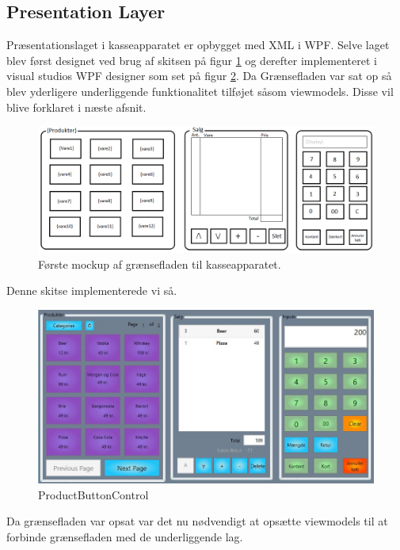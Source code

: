 
\subsection{Presentation Layer}
Præsentationslaget i kasseapparatet er opbygget med XML i WPF. Selve laget blev først designet ved brug af skitsen på figur \ref{fig:KasseMockup} og derefter implementeret i visual studios WPF designer som set på figur \ref{fig:EndeligeGUI}. Da Grænsefladen var sat op så blev yderligere underliggende funktionalitet tilføjet såsom viewmodels. Disse vil blive forklaret i næste afsnit.

\begin{figure}[H]
	\centering
	\includegraphics[width=1\textwidth]{Systemdesign/Frontend/pics/KasseMockup}
	\caption{Første mockup af grænsefladen til kasseapparatet.}
	\label{fig:KasseMockup}
\end{figure}

Denne skitse implementerede vi så.

\begin{figure}[H]
	\centering
	\includegraphics[width=1\textwidth]{Systemdesign/Frontend/pics/GUI}
	\caption{ProductButtonControl}
	\label{fig:EndeligeGUI}
\end{figure}

Da grænsefladen var opsat var det nu nødvendigt at opsætte viewmodels til at forbinde grænsefladen med de underliggende lag.


